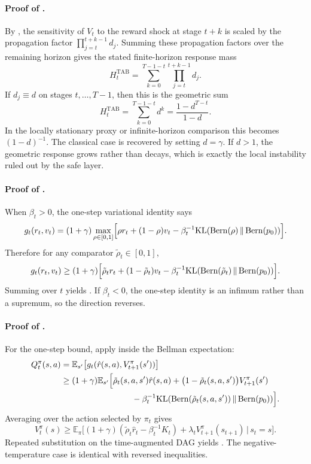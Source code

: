 \documentclass{article}
\theoremstyle{remark}
\DeclareMathOperator{\Bern}{Bern}
\newcommand{\E}{\mathbb{E}}
\newcommand{\KL}{\mathrm{KL}}
\newcommand{\pprior}{p_0}
\newcommand{\KLbin}[2]{\KL\!\left(\Bern(#1)\,\middle\|\,\Bern(#2)\right)}
\begin{document}
\paragraph{Proof of .}
By , the sensitivity of $V_t$ to the reward shock at stage $t+k$ is scaled by the propagation factor $\prod_{j=t}^{t+k-1}d_j$. Summing these propagation factors over the remaining horizon gives the stated finite-horizon response mass
\[
H_t^{\mathrm{TAB}}=\sum_{k=0}^{T-1-t}\prod_{j=t}^{t+k-1}d_j.
\]
If $d_j\equiv d$ on stages $t,\dots,T-1$, then this is the geometric sum
\[
H_t^{\mathrm{TAB}}=\sum_{k=0}^{T-1-t}d^k=\frac{1-d^{T-t}}{1-d}.
\]
In the locally stationary proxy or infinite-horizon comparison this becomes $(1-d)^{-1}$. The classical case is recovered by setting $d=\gamma$. If $d>1$, the geometric response grows rather than decays, which is exactly the local instability ruled out by the safe layer.

\paragraph{Proof of .}
When $\beta_t>0$, the one-step variational identity says
\[
g_t(r_t,v_t)=(1+\gamma)\max_{\rho\in[0,1]}\Bigl[\rho r_t+(1-\rho)v_t-\beta_t^{-1}\KLbin{\rho}{\pprior}\Bigr].
\]
Therefore for any comparator $\tilde\rho_t\in[0,1]$,
\[
g_t(r_t,v_t)\ge (1+\gamma)\Bigl[\tilde\rho_t r_t+(1-\tilde\rho_t)v_t-\beta_t^{-1}\KLbin{\tilde\rho_t}{\pprior}\Bigr].
\]
Summing over $t$ yields .
If $\beta_t<0$, the one-step identity is an infimum rather than a supremum, so the direction reverses.

\paragraph{Proof of .}
For the one-step bound, apply  inside the Bellman expectation:
\begin{align*}
Q_t^\pi(s,a)
&=\E_{s'}\bigl[g_t(\hat r(s,a),V_{t+1}^\pi(s'))\bigr]\\
&\ge (1+\gamma)\E_{s'}\Bigl[
    \tilde\rho_t(s,a,s')\hat r(s,a)
    +\bigl(1-\tilde\rho_t(s,a,s')\bigr)V_{t+1}^\pi(s') \\
&\hspace{8.5em}
    -\beta_t^{-1}\KLbin{\tilde\rho_t(s,a,s')}{\pprior}
\Bigr].
\end{align*}
Averaging over the action selected by $\pi_t$ gives
\[
V_t^\pi(s)\ge \E_\pi\bigl[(1+\gamma)(\tilde\rho_t\hat r_t-\beta_t^{-1}K_t)+\lambda_t V_{t+1}^\pi(s_{t+1})\,|\,s_t=s\bigr].
\]
Repeated substitution on the time-augmented DAG yields .
The negative-temperature case is identical with reversed inequalities.
\end{document}
